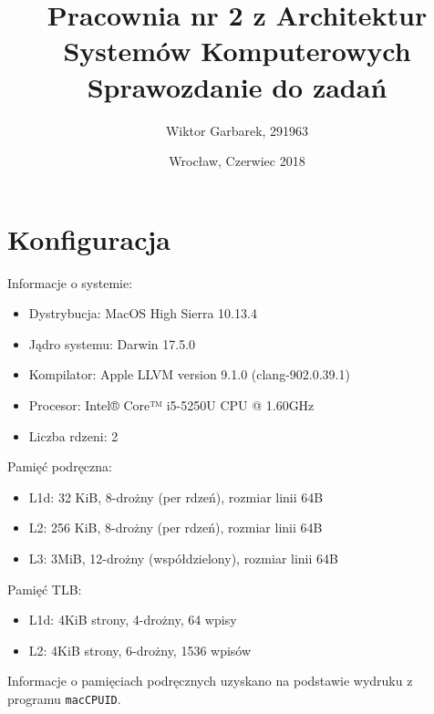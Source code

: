 \documentclass[10pt,wide]{mwart}
\begin{document}
\title{\textbf{Pracownia nr 2 z Architektur Systemów Komputerowych}\\
Sprawozdanie do zadań}
\author{Wiktor Garbarek, 291963}
\date{Wrocław, Czerwiec 2018}

\maketitle
 \thispagestyle{empty}
 \section{Konfiguracja}
 Informacje o systemie:

\begin{itemize}
  \item Dystrybucja: MacOS High Sierra 10.13.4
  \item Jądro systemu: Darwin 17.5.0
  \item Kompilator: Apple LLVM version 9.1.0 (clang-902.0.39.1)
  \item Procesor: Intel® Core™ i5-5250U CPU @ 1.60GHz
  \item Liczba rdzeni: 2
\end{itemize}

Pamięć podręczna:

\begin{itemize}
  \item L1d: 32 KiB, 8-drożny (per rdzeń), rozmiar linii 64B
  \item L2: 256 KiB, 8-drożny (per rdzeń), rozmiar linii 64B
  \item L3: 3MiB, 12-drożny (współdzielony), rozmiar linii 64B
\end{itemize}

Pamięć TLB:

\begin{itemize}
  \item L1d: 4KiB strony, 4-drożny, 64 wpisy
  \item L2: 4KiB strony, 6-drożny, 1536 wpisów
\end{itemize}

Informacje o pamięciach podręcznych uzyskano na podstawie wydruku z programu \texttt{macCPUID}.
\end{document}
